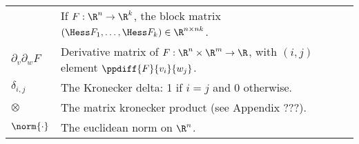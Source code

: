 \begin{table}[h!]
{\begin{tabular}{ll}
               & If \(F : \R^n \rightarrow \R^k\), the block matrix \((\Hess F_1, \ldots, \Hess F_k) \in \R^{n \times nk}\). \\
   \(\partial_v \partial_w F\) & Derivative matrix of \(F : \R^n \times \R^m \rightarrow \R\), with \((i,j)\) element \(\ppdiff{F}{v_i}{w_j}\). \\
   \(\delta_{i,j}\) & The Kronecker delta: 1 if \(i = j\) and 0 otherwise. \\
   \(\otimes\) & The matrix kronecker product (see Appendix ???). \\
   \(\norm{\cdot}\) & The euclidean norm on \(\R^n\). \\
   \bottomrule
\end{tabular}

}%
\end{table}

%
%

